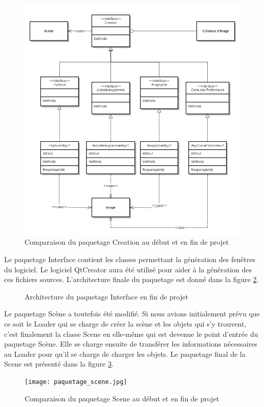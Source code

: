 \begin{figure}[h]
		\centering
		\includegraphics[scale=0.4]{package_creation.jpg}
		\caption{\label{fig:creation} Comparaison du paquetage Creation au début et en fin de projet \protect \footnotemark}
\end{figure}


Le paquetage Interface contient les classes permettant la génération des fenêtres du logiciel. Le logiciel QtCreator aura été utilisé pour aider à la génération des ces fichiers sources. L'architecture finale du paquetage est donné dans la figure \ref{fig:interface}.


\begin{figure}[h]
		\centering
		\caption{\label{fig:interface} Architecture du paquetage Interface en fin de projet \protect \footnotemark}
\end{figure}

Le paquetage Scène a toutefois été modifié. Si nous avions initialement prévu que ce soit le Loader qui se charge de créer la scène et les objets qui s'y trouvent, c'est finalement la classe Scene en elle-même qui est devenue le point d'entrée du paquetage Scène. Elle se charge ensuite de transférer les informations nécessaires au Loader pour qu'il se charge de charger les objets. Le paquetage final de la Scene est présenté dans la figure \ref{fig:scene}.

\begin{figure}[h]
		\centering
		\texttt{[image: paquetage\_scene.jpg]}
		\caption{\label{fig:scene} Comparaison du paquetage Scene au début et en fin de projet \protect \footnotemark}
\end{figure}
